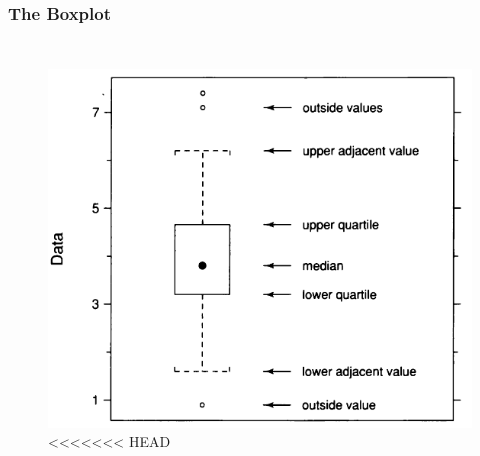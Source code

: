 \documentclass[aspectratio=1610]{beamer}
\begin{document}
\begin{frame}
	\frametitle{The Boxplot}
	\begin{columns}
		\begin{figure}
			\begin{center}
				\includegraphics[width=1.0\textwidth]{figures/boxplot.png}
<<<<<<< HEAD
			\end{center}
		\end{figure}
	\end{columns}
\end{frame}
\end{document}
